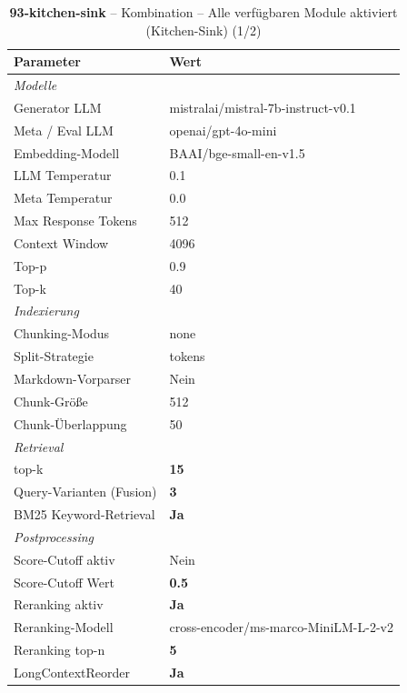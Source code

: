 \begin{table}[H]
\centering
\small
\setlength{\tabcolsep}{4pt}
\begin{tabular}{lp{8cm}}
\toprule
\textbf{Parameter} & \textbf{Wert} \\
\midrule
\multicolumn{2}{l}{\textit{Modelle}} \\
\midrule
\quad Generator LLM & mistralai/mistral-7b-instruct-v0.1 \\
\quad Meta / Eval LLM & openai/gpt-4o-mini \\
\quad Embedding-Modell & BAAI/bge-small-en-v1.5 \\
\quad LLM Temperatur & 0.1 \\
\quad Meta Temperatur & 0.0 \\
\quad Max Response Tokens & 512 \\
\quad Context Window & 4096 \\
\quad Top-p & 0.9 \\
\quad Top-k & 40 \\
\midrule
\multicolumn{2}{l}{\textit{Indexierung}} \\
\midrule
\quad Chunking-Modus & none \\
\quad Split-Strategie & tokens \\
\quad Markdown-Vorparser & Nein \\
\quad Chunk-Größe & 512 \\
\quad Chunk-Überlappung & 50 \\
\midrule
\multicolumn{2}{l}{\textit{Retrieval}} \\
\midrule
\quad top-k & \textbf{15} \\
\quad Query-Varianten (Fusion) & \textbf{3} \\
\quad BM25 Keyword-Retrieval & \textbf{Ja} \\
\midrule
\multicolumn{2}{l}{\textit{Postprocessing}} \\
\midrule
\quad Score-Cutoff aktiv & Nein \\
\quad Score-Cutoff Wert & \textbf{0.5} \\
\quad Reranking aktiv & \textbf{Ja} \\
\quad Reranking-Modell & cross-encoder/ms-marco-MiniLM-L-2-v2 \\
\quad Reranking top-n & \textbf{5} \\
\quad LongContextReorder & \textbf{Ja} \\
\bottomrule
\end{tabular}
\caption{\textbf{93-kitchen-sink} -- Kombination -- Alle verfügbaren Module aktiviert (Kitchen-Sink) (1/2)}
\label{tab:config_93_kitchen_sink_a}
\end{table}

